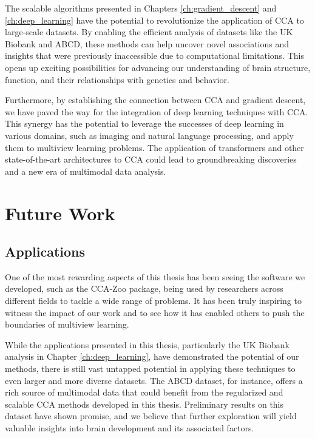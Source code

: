 The scalable algorithms presented in Chapters \ref{ch:gradient_descent} and \ref{ch:deep_learning} have the potential to revolutionize the application of CCA to large-scale datasets. By enabling the efficient analysis of datasets like the UK Biobank and ABCD, these methods can help uncover novel associations and insights that were previously inaccessible due to computational limitations. This opens up exciting possibilities for advancing our understanding of brain structure, function, and their relationships with genetics and behavior.

Furthermore, by establishing the connection between CCA and gradient descent, we have paved the way for the integration of deep learning techniques with CCA. This synergy has the potential to leverage the successes of deep learning in various domains, such as imaging and natural language processing, and apply them to multiview learning problems. The application of transformers and other state-of-the-art architectures to CCA could lead to groundbreaking discoveries and a new era of multimodal data analysis.

\section{Future Work}

\subsection{Applications}

One of the most rewarding aspects of this thesis has been seeing the software we developed, such as the CCA-Zoo package, being used by researchers across different fields to tackle a wide range of problems. It has been truly inspiring to witness the impact of our work and to see how it has enabled others to push the boundaries of multiview learning.

While the applications presented in this thesis, particularly the UK Biobank analysis in Chapter \ref{ch:deep_learning}, have demonstrated the potential of our methods, there is still vast untapped potential in applying these techniques to even larger and more diverse datasets. The ABCD dataset, for instance, offers a rich source of multimodal data that could benefit from the regularized and scalable CCA methods developed in this thesis. Preliminary results on this dataset have shown promise, and we believe that further exploration will yield valuable insights into brain development and its associated factors.

